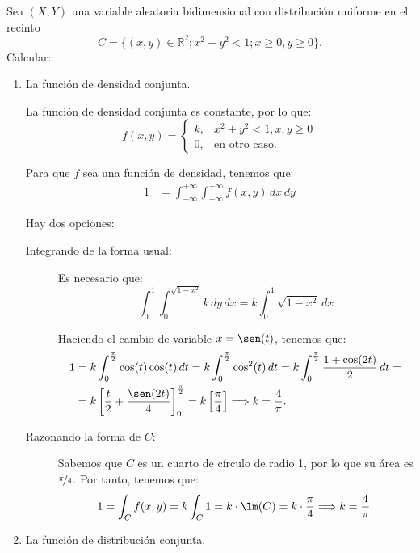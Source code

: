 \begin{ejercicio}
    Sea $(X,Y)$ una variable aleatoria bidimensional con distribución uniforme en el recinto
    \[
        C = \{(x, y) \in \mathbb{R}^2; x^2 + y^2 < 1; x \geq 0, y \geq 0\}.
    \]
    Calcular:
    \begin{enumerate}
        \item La función de densidad conjunta.
        
        La función de densidad conjunta es constante, por lo que:
        \begin{equation*}
            f(x, y) = \begin{cases}
                k, & x^2+y^2<1, x,y\geq 0 \\
                0, & \text{en otro caso}.
            \end{cases}
        \end{equation*}

        Para que $f$ sea una función de densidad, tenemos que:
        \begin{align*}
            1&=\int_{-\infty}^{+\infty} \int_{-\infty}^{+\infty} f(x, y) \, dx \, dy
        \end{align*}

        Hay dos opciones:
        \begin{description}
            \item[Integrando de la forma usual:]
            
            Es necesario que:
            \begin{equation*}
                \int_{0}^{1} \int_{0}^{\sqrt{1-x^2}} k \, dy \, dx = k\int_{0}^{1} \sqrt{1-x^2} \, dx
            \end{equation*}

            Haciendo el cambio de variable $x=\sen(t)$, tenemos que:
            \begin{align*}
                1&=k\int_{0}^{\frac{\pi}{2}} \cos(t)\cos(t) \, dt = k\int_{0}^{\frac{\pi}{2}} \cos^2(t) \, dt
                = k\int_{0}^{\frac{\pi}{2}} \dfrac{1+\cos(2t)}{2} \, dt
                =\\&= k\left[\dfrac{t}{2}+\dfrac{\sen(2t)}{4}\right]_0^{\frac{\pi}{2}}
                = k\left[\dfrac{\pi}{4}\right] \Longrightarrow k=\dfrac{4}{\pi}.
            \end{align*}

            \item[Razonando la forma de $C$:]
            
            Sabemos que $C$ es un cuarto de círculo de radio 1, por lo que su área es $\nicefrac{\pi}{4}$. Por tanto, tenemos que:
            \begin{equation*}
                1=\int_C f(x, y) = k\int_C 1 = k\cdot \lm(C) = k\cdot \dfrac{\pi}{4} \Longrightarrow k=\dfrac{4}{\pi}.
            \end{equation*}
        \end{description}
        \item La función de distribución conjunta.
        

\end{enumerate}
\end{ejercicio}
